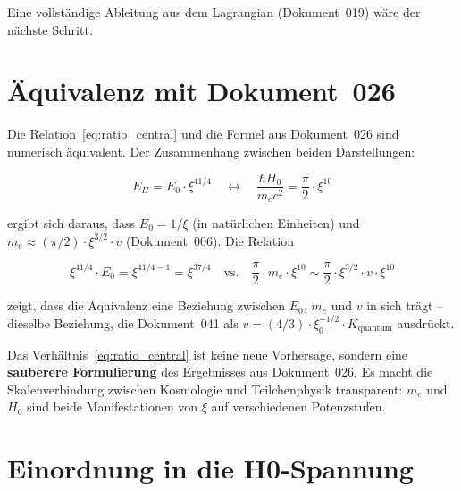 Eine vollständige Ableitung aus dem Lagrangian (Dokument~019) wäre der
nächste Schritt.

\section{Äquivalenz mit Dokument~026}
\label{sec:aequivalenz}

Die Relation~\eqref{eq:ratio_central} und die Formel aus Dokument~026
sind numerisch äquivalent. Der Zusammenhang zwischen beiden Darstellungen:

\begin{equation}
    E_H = E_0 \cdot \xi^{41/4}
    \quad \longleftrightarrow \quad
    \frac{\hbar H_0}{m_e c^2} = \frac{\pi}{2} \cdot \xi^{10}
\end{equation}

ergibt sich daraus, dass $E_0 = 1/\xi$ (in natürlichen Einheiten) und
$m_e \approx (\pi/2) \cdot \xi^{3/2} \cdot v$ (Dokument~006). Die Relation

\begin{equation}
    \xi^{41/4} \cdot E_0 = \xi^{41/4 - 1} = \xi^{37/4}
    \quad \text{vs.} \quad
    \frac{\pi}{2} \cdot m_e \cdot \xi^{10} \sim \frac{\pi}{2} \cdot \xi^{3/2} \cdot v \cdot \xi^{10}
\end{equation}

zeigt, dass die Äquivalenz eine Beziehung zwischen $E_0$, $m_e$ und $v$
in sich trägt -- dieselbe Beziehung, die Dokument~041 als
$v = (4/3) \cdot \xi_0^{-1/2} \cdot K_\text{quantum}$ ausdrückt.

\begin{interpretation}
    Das Verhältnis~\eqref{eq:ratio_central} ist keine neue Vorhersage,
    sondern eine \textbf{sauberere Formulierung} des Ergebnisses aus
    Dokument~026. Es macht die Skalenverbindung zwischen Kosmologie
    und Teilchenphysik transparent: $m_e$ und $H_0$ sind beide
    Manifestationen von $\xi$ auf verschiedenen Potenzstufen.
\end{interpretation}

\section{Einordnung in die H0-Spannung}
\label{sec:hubble}

